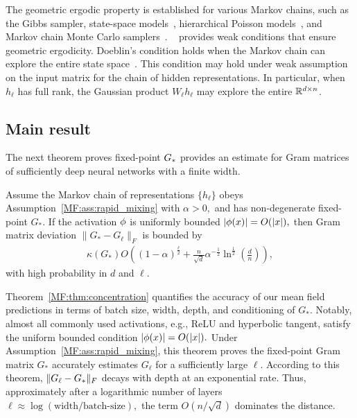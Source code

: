 The geometric ergodic property is established for various Markov chains, such as the Gibbs sampler, state-space models~\cite{eberle2009markov}, hierarchical Poisson models~\cite{rosenthal1995minorization}, and Markov chain Monte Carlo samplers~\cite{jones2001honest}. ~\citet{doeblin1938deux} provides weak conditions that ensure geometric ergodicity. Doeblin's condition holds when the Markov chain can explore the entire state space~\cite{eberle2009markov}. This condition may hold under weak assumption on the input matrix for the chain of hidden representations.  
In particular, when $h_\ell$ has full rank, the Gaussian product $W_\ell h_\ell$ may explore the entire $\mathbb{R}^{d\times n}$.  



\subsection{Main result}
The next theorem proves fixed-point ${G_*}$ provides an estimate for Gram matrices of sufficiently deep neural networks with a finite width. 

\begin{theorem}\label{MF:thm:concentration}
Assume the Markov chain of representations $\{h_\ell\}$ obeys Assumption~\ref{MF:ass:rapid_mixing} with $\alpha >0,$ and has non-degenerate fixed-point $G_*.$ If the activation $\phi$ is uniformly bounded $|\phi(x)| = O(|x|),$ then Gram matrix deviation $\|G_*-G_\ell\|_F$ is bounded by
\begin{align}
\kappa(G_*) O\left((1-\alpha)^{\frac{\ell}{2}}+ \frac{n}{\sqrt{d}}\alpha^{-\frac12}\ln^{\frac12}(\frac{d}{n}) \right),
\end{align}
with high probability in $d$ and $\ell.$
\end{theorem}

Theorem~\ref{MF:thm:concentration} quantifies the accuracy of our mean field predictions in terms of batch size, width, depth, and conditioning of $G_*$. Notably, almost all commonly used activations, e.g., ReLU and hyperbolic tangent, satisfy the uniform bounded condition $|\phi(x)|=O(|x|).$ Under Assumption~\ref{MF:ass:rapid_mixing}, this theorem proves the fixed-point Gram matrix $G_*$ accurately estimates $G_\ell$ for a sufficiently large $\ell$. According to this theorem, $\| G_\ell - {G_*} \|_F$ decays with depth at an exponential rate. Thus, approximately after a logarithmic number of layers $\ell\approx \log(\text{width}/\text{batch-size}),$ the term $O(n /\sqrt{d})$ dominates the distance.

